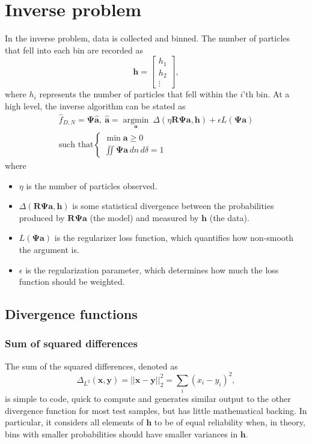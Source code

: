 \documentclass[journal]{IEEEtran}
\begin{document}
\section{Inverse problem}
In the inverse problem, data is collected and binned. The number of particles that fell into each bin are recorded as
\begin{equation}
\mathbf{h}=\begin{bmatrix}h_1\\h_2\\\vdots\end{bmatrix},
\end{equation}
where $h_i$ represents the number of particles that fell within the $i$'th bin. At a high level, the inverse algorithm can be stated as
\begin{multline}
    \hat{f}_{\scriptscriptstyle{D, N}}=\bm{\Psi}\mathbf{\hat{a}},\ {\mathbf{\hat{a}}}=\underset{\mathbf{a}}{\operatorname{argmin}}\ \Delta(\eta\bm{R}\bm{\Psi}\mathbf{a}, \mathbf{h})+\epsilon L(\bm{\Psi}\mathbf{a})\\
    \textrm{such that} \begin{cases}
        \operatorname{min}\mathbf{a}\geq0\\
        \iint\bm{\Psi}\mathbf{a}\, dn\,d\delta=1
    \end{cases}
\end{multline}
where 
\begin{itemize}
    \item $\eta$ is the number of particles observed.
    \item $\Delta(\bm{R}\bm{\Psi}\mathbf{a}, \mathbf{h})$ is some statistical divergence between the probabilities produced by $\bm{R}\bm{\Psi}\mathbf{a}$ (the model) and measured by $\mathbf{h}$ (the data).
    \item $L(\bm{\Psi}\mathbf{a})$ is the regularizer loss function, which quantifies how non-smooth the argument is.
    \item $\epsilon$ is the regularization parameter, which determines how much the loss function should be weighted.
\end{itemize}
\subsection{Divergence functions}
\subsubsection{Sum of squared differences}
The sum of the squared differences, denoted as
\begin{equation}    
\Delta_{L^2}(\mathbf{x}, \mathbf{y})=||\mathbf{x}-\mathbf{y}||_2^2=\sum_{i}(x_i-y_i)^2,
\end{equation}
is simple to code, quick to compute and generates similar output to the other divergence function for most test samples, but has little mathematical backing. In particular, it considers all elements of $\mathbf{h}$ to be of equal reliability when, in theory, bins with smaller probabilities should have smaller variances in $\mathbf{h}$.
\end{document}
